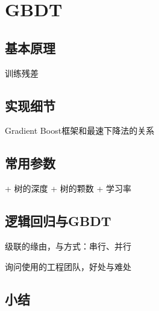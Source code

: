 \chapter{GBDT}

\section{基本原理}
训练残差

\section{实现细节}
Gradient Boost框架和最速下降法的关系

\section{常用参数}
+ 树的深度
+ 树的颗数
+ 学习率

\section{逻辑回归与GBDT}
级联的缘由，与方式：串行、并行

询问使用的工程团队，好处与难处

\section{小结}
